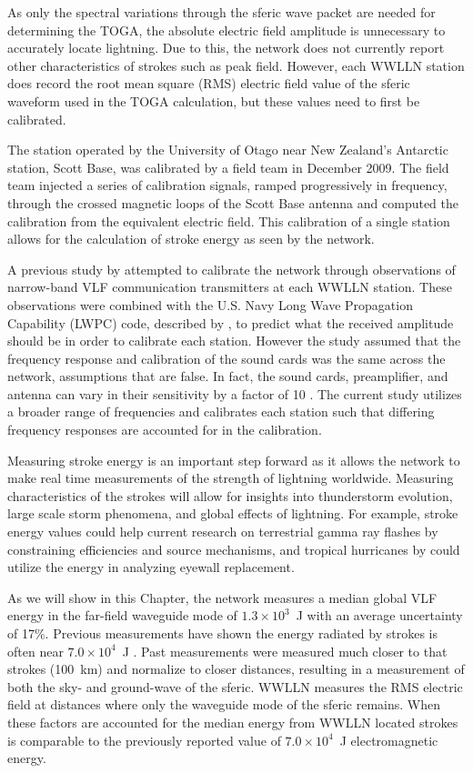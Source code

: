 As only the spectral variations through the sferic wave packet are needed for determining the TOGA, the absolute electric field amplitude is unnecessary to accurately locate lightning. Due to this, the network does not currently report other characteristics of strokes such as peak field.
However, each WWLLN station does record the root mean square (RMS) electric field value of the sferic waveform used in the TOGA calculation, but these values need to first be calibrated.

The station operated by the University of Otago near New Zealand's Antarctic station, Scott Base, was calibrated by a field team in December 2009.
The field team injected a series of calibration signals, ramped progressively in frequency, through the crossed magnetic loops of the Scott Base antenna and computed the calibration from the equivalent electric field.
This calibration of a single station allows for the calculation of stroke energy as seen by the network.

A previous study by \citet{Rodger2006} attempted to calibrate the network through observations of narrow-band VLF communication transmitters at each WWLLN station.
These observations were combined with the U.S. Navy Long Wave Propagation Capability (LWPC) code, described by \citet{Ferguson1998}, to predict what the received amplitude should be in order to calibrate each station.
However the study assumed that the frequency response and calibration of the sound cards was the same across the network, assumptions that are false.
In fact, the sound cards, preamplifier, and antenna can vary in their sensitivity by a factor of 10 . 
The current study utilizes a broader range of frequencies and calibrates each station such that differing frequency responses are accounted for in the calibration.

Measuring stroke energy is an important step forward as it allows the network to make real time measurements of the strength of lightning worldwide.
Measuring characteristics of the strokes will allow for insights into thunderstorm evolution, large scale storm phenomena, and global effects of lightning.
For example, stroke energy values could help current research on terrestrial gamma ray flashes by \citet{Briggs2011} constraining efficiencies and source mechanisms, and tropical hurricanes by \citet{Thomas2010d} could utilize the energy in analyzing eyewall replacement.

As we will show in this Chapter, the network measures a median global VLF energy in the far-field waveguide mode of $1.3 \times 10^3$~J with an average uncertainty of 17\%.
Previous measurements have shown the energy radiated by strokes is often near $7.0 \times 10^{4}$~J \citep{Taylor1963}.
Past measurements were measured much closer to that strokes (100~km) and normalize to closer distances, resulting in a measurement of both the sky- and ground-wave of the sferic.
WWLLN measures the RMS electric field at distances where only the waveguide mode of the sferic remains.
When these factors are accounted for the median energy from WWLLN located strokes is comparable to the previously reported value of $7.0 \times 10^{4}$~J electromagnetic energy.

